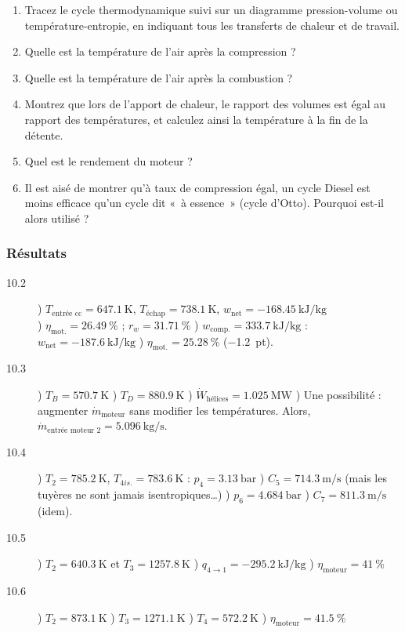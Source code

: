 	\begin{enumerate}
		\item Tracez le cycle thermodynamique suivi sur un diagramme pression-volume ou tem\-pérature-entropie, en indiquant tous les transferts de chaleur et de travail.
		\item Quelle est la température de l’air après la compression ?
		\item Quelle est la température de l’air après la combustion ?
		\item Montrez que lors de l’apport de chaleur, le rapport des volumes est égal au rapport des températures, et calculez ainsi la température à la fin de la détente.
		\item Quel est le rendement du moteur ?
		\item Il est aisé de montrer qu’à taux de compression égal, un cycle Diesel est moins efficace qu’un cycle dit «~à essence~» (cycle d’Otto). Pourquoi est-il alors utilisé ?
	\end{enumerate}

\exercisesolutionpage
\subsubsection*{Résultats}
	\linktosolutionsblurb
	
	\begin{description}
		\item [10.2] 
	 		) $T_\text{entrée cc} = \SI{647,1}{\kelvin}$, $T_\text{échap} = \SI{738,1}{\kelvin}$, $w_\text{net} = \SI{-168,45}{\kilo\joule\per\kilogram}$ \\
	 		) $\eta_\text{mot.} = \SI{26,49}{\percent}$ ; $r_{w} = \SI{31,71}{\percent}$ 
	 		) $w_\text{comp.} = \SI{+333,7}{\kilo\joule\per\kilogram}$ :\\ $w_\text{net} = \SI{-187,6}{\kilo\joule\per\kilogram}$ 
	 		) $\eta_\text{mot.} = \SI{25,28}{\percent}$ (\SI{-1,2}{pt}).
		\item [10.3] 
	 		) $T_{B} = \SI{570,7}{\kelvin}$ 
	 		) $T_{D} = \SI{880,9}{\kelvin}$ 
	 		) $\dot{W}_\text{hélices} = \SI{1,025}{\mega\watt}$ 
	 		) Une possibilité : augmenter $\dot{m}_\text{moteur}$ sans modifier les températures. Alors, $\dot{m}_\text{entrée~moteur~2} = \SI{5,096}{\kilogram\per\second}$.
		\item [10.4] 
	 		) $T_{2} = \SI{785,2}{\kelvin}$, $T_{4is.} = \SI{783,6}{\kelvin}$ : $p_4 = \SI{3,13}{\bar}$ 
	 		) $C_{5} = \SI{714,3}{\metre\per\second}$ (mais les tuyères ne sont jamais isentropiques…)
	 		) $p_6 = \SI{4,684}{\bar}$ 
	 		) $C_{7}= \SI{811,3}{\metre\per\second}$ (idem).
		\item [10.5] 
	 		) $T_{2} = \SI{640,3}{\kelvin}$ et $T_{3} = \SI{1257,8}{\kelvin}$ 
	 		) $q_{4\to 1} = \SI{-295,2}{\kilo\joule\per\kilogram}$
	 		) $\eta_\text{moteur} = \SI{41}{\percent}$
	 	\item [10.6]
	 		) $T_{2} = \SI{873,1}{\kelvin}$
	 		) $T_{3} = \SI{1271,1}{\kelvin}$ 
	 		) $T_{4} = \SI{572,2}{\kelvin}$
	 		) $\eta_\text{moteur} = \SI{41,5}{\percent}$
	\end{description}

